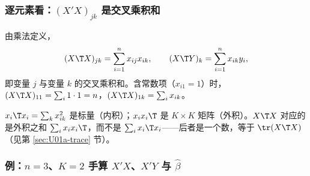 \subsubsection{逐元素看：\texorpdfstring{$(X'X)_{jk}$}{(X'X)\_jk} 是交叉乘积和}

由乘法定义，
\[
(X\T X)_{jk}=\sum_{i=1}^n x_{ij}x_{ik},\qquad (X\T Y)_k=\sum_{i=1}^n x_{ik}y_i,
\]
即变量 $j$ 与变量 $k$ 的交叉乘积和。含常数项（$x_{i1}=1$）时，$(X\T X)_{11}=\sum_i 1\cdot1=n$，$(X\T X)_{1k}=\sum_i x_{ik}$。

\begin{note}[区分 $x_i'x_i$ 与 $x_ix_i'$]
$x_i\T x_i=\sum_k x_{ik}^2$ 是标量（内积）；$x_ix_i\T$ 是 $K\times K$ 矩阵（外积）。$X\T X$ 对应的是外积之和 $\sum_i x_ix_i\T$，而不是 $\sum_i x_i\T x_i$——后者是一个数，等于 $\tr(X\T X)$（见第 \ref{sec:U01a-trace} 节）。
\end{note}

\subsubsection{例：\texorpdfstring{$n=3$、$K=2$}{n=3, K=2} 手算 \texorpdfstring{$X'X$、$X'Y$ 与 $\hat\beta$}{X'X, X'Y and beta-hat}}\label{ss:U01a-n3}

